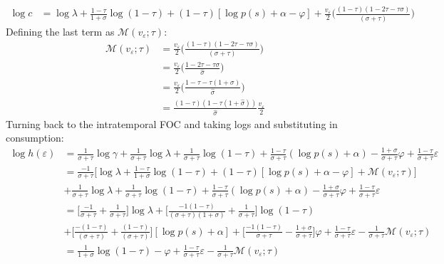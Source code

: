 \documentclass{article}
\newcommand{\M}{\mathcal{M}}
\begin{document}
\begin{itemize}
\begin{align*}
\log c &= \log \lambda + \frac{1-\tau}{1 +\sigma}\log(1-\tau) + (1-\tau)[\log p(s) + \alpha - \varphi] + \frac{v_\varepsilon}{2}\Bigg( \frac{(1-\tau)(1-2\tau-\tau\sigma)}{(\sigma+\tau)}\Bigg)
\end{align*}
Defining the last term as $\M ( v_\varepsilon; \tau)$:
\begin{align*}
\M ( v_\varepsilon; \tau) 
&= \frac{v_\varepsilon}{2}\Bigg( \frac{(1-\tau)(1-2\tau-\tau\sigma)}{(\sigma+\tau)}\Bigg)\\
&= \frac{v_\varepsilon}{2}\Bigg( \frac{1-2\tau-\tau\sigma}{\hat \sigma}\Bigg)\\
&= \frac{v_\varepsilon}{2}\Bigg( \frac{1-\tau-\tau(1+\sigma)}{\hat \sigma}\Bigg)\\
&= \frac{(1-\tau)(1 - \tau(1+\hat \sigma))}{\hat \sigma} \frac{v_\varepsilon}{2}
\end{align*}
Turning back to the intratemporal FOC and taking logs and substituting in consumption:
\begin{align*}
\log h(\varepsilon) 
&= \frac{1}{\sigma+\tau}\log\gamma + \frac{1}{\sigma+\tau} \log \lambda + \frac{1}{\sigma+\tau} \log(1-\tau) + \frac{1-\tau}{\sigma +\tau}(\log p(s)+ \alpha)-\frac{1+\sigma}{\sigma+\tau} \varphi   +  \frac{1-\tau}{\sigma+\tau} \varepsilon  \\
&= \frac{-1}{\sigma+\tau}\Bigg[ \log \lambda + \frac{1-\tau}{1 +\sigma}\log(1-\tau) + (1-\tau)[\log p(s) + \alpha - \varphi] + \M ( v_\varepsilon; \tau) \Bigg] \\
&+ \frac{1}{\sigma+\tau} \log \lambda + \frac{1}{\sigma+\tau} \log(1-\tau) + \frac{1-\tau}{\sigma +\tau}(\log p(s)+ \alpha)-\frac{1+\sigma}{\sigma+\tau} \varphi   +  \frac{1-\tau}{\sigma+\tau} \varepsilon\\
&= \Bigg[\frac{-1}{\sigma + \tau} + \frac{1}{\sigma + \tau}  \Bigg] \log \lambda
+ \Bigg[\frac{-1(1-\tau)}{(\sigma + \tau)(1+\sigma)} + \frac{1}{\sigma + \tau}\Bigg] \log (1-\tau)
\\&+ \Bigg[\frac{-(1-\tau)}{(\sigma + \tau)} + \frac{(1-\tau)}{(\sigma+\tau)}\Bigg] [\log p(s) + \alpha]
+ \Bigg[\frac{-1(1-\tau)}{\sigma+\tau} -\frac{1+\sigma}{\sigma+\tau} \Bigg] \varphi
+ \frac{1-\tau}{\sigma+\tau} \varepsilon
- \frac{1}{\sigma+\tau} \M ( v_\varepsilon; \tau)\\
&=  \frac{1}{1+\sigma} \log (1-\tau) - \varphi
+ \frac{1-\tau}{\sigma+\tau} \varepsilon
- \frac{1}{\sigma+\tau} \M ( v_\varepsilon; \tau)
\end{align*}

\end{itemize}
\end{document}
